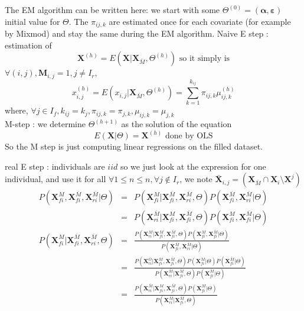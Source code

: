 \documentclass[11pt,a4paper]{report}
\begin{document}
			The EM algorithm can be written here: we start with some $\Theta^{(0)}=(\boldsymbol{\alpha},\boldsymbol{\varepsilon}) $ initial value for $\Theta$. The $\pi_{ij,k}$ are estimated once for each covariate (for example by Mixmod) and stay the same during the EM algorithm.
			Naive E step : estimation of 
			\begin{equation}
				\boldsymbol{X}^{(h)}=E(\boldsymbol{X}|\boldsymbol{X}_{\bar M},\Theta^{(h)}) \textrm{ so it simply is}
			\end{equation}
			$\forall (i,j), \boldsymbol{M}_{i,j}=1, j\neq I_r$, 			
			\begin{equation}
				x^{(h)}_{i,j}=E(x_{i,j}|\boldsymbol{X}_{\bar M},\Theta^{(h)}) =\sum_{k=1}^{k_{ij}}\pi_{ij,k}\mu_{ij,k}^{(h)} \label{Estep}
			\end{equation}
			where, $\forall j \in I_f, k_{ij}=k_j, \pi_{ij,k}=\pi_{j,k}, \mu_{ij,k}=\mu_{j,k}$ \\
			M-step : we determine $\Theta^{(h+1)}$ as the solution of the equation
			\begin{equation}
				E(\boldsymbol{X}|\Theta)=\boldsymbol{X}^{(h)} \textrm{ done by OLS}
			\end{equation}
			So the M step is just computing linear regressions on the filled dataset.
			
			
		real E step : individuals are $iid$ so we just look at the expression for one individual, and use it for all
		$\forall 1\leq n \leq n , \forall j \notin I_r$, we note $\bar{\boldsymbol{X}}_{i,j}=(\boldsymbol{X}_{\bar M}\cap \boldsymbol{X}_{i} \setminus \boldsymbol{X}^j)$ 
			\begin{eqnarray}
				P(\boldsymbol{X}_{fi}^M,\boldsymbol{X}_{fi}^{\bar M},\boldsymbol{X}_{ri}^{\bar M} | \Theta)&=&
					P(\boldsymbol{X}_{fi}^M|\boldsymbol{X}_{fi}^{\bar M},\boldsymbol{X}_{ri}^{\bar M},\Theta)P(\boldsymbol{X}_{fi}^{\bar M},\boldsymbol{X}_{ri}^{\bar M}|\Theta) \\
				&=&P(\boldsymbol{X}_{ri}^{\bar M}|\boldsymbol{X}_{fi}^{M},\boldsymbol{X}_{fi}^{\bar M},\Theta)P(\boldsymbol{X}_{fi}^{M},\boldsymbol{X}_{fi}^{\bar M}|\Theta) \\
				P(\boldsymbol{X}_{fi}^M|\boldsymbol{X}_{fi}^{\bar M},\boldsymbol{X}_{ri}^{\bar M},\Theta)&=&\frac{P(\boldsymbol{X}_{ri}^M|\boldsymbol{X}_{fi}^{M},\boldsymbol{X}_{fi}^{\bar M},\Theta)P(\boldsymbol{X}_{fi}^{M},\boldsymbol{X}_{fi}^{\bar M}|\Theta)}{P(\boldsymbol{X}_{fi}^{\bar M},\boldsymbol{X}_{ri}^{\bar M}|\Theta)} \\
				&=&\frac{P(\boldsymbol{X}_{ri}^{O}|\boldsymbol{X}_{fi}^{M},\boldsymbol{X}_{fi}^{\bar M},\Theta)P(\boldsymbol{X}_{fi}^{M}|\Theta)P(\boldsymbol{X}_{fi}^{\bar M}|\Theta)
				}{
				P(\boldsymbol{X}_{ri}^{\bar M}|\boldsymbol{X}_{fi}^{\bar M},\Theta)P(\boldsymbol{X}_{fi}^{\bar M}|\Theta)
				} \\
				&=&\frac{P(\boldsymbol{X}_{ri}^{\bar M}|\boldsymbol{X}_{fi}^{M},\boldsymbol{X}_{fi}^{\bar M},\Theta)P(\boldsymbol{X}_{fi}^{M}|\Theta)}{P(\boldsymbol{X}_{ri}^{\bar M}|\boldsymbol{X}_{fi}^{\bar M},\Theta)}
			\end{eqnarray}
			
\end{document}
